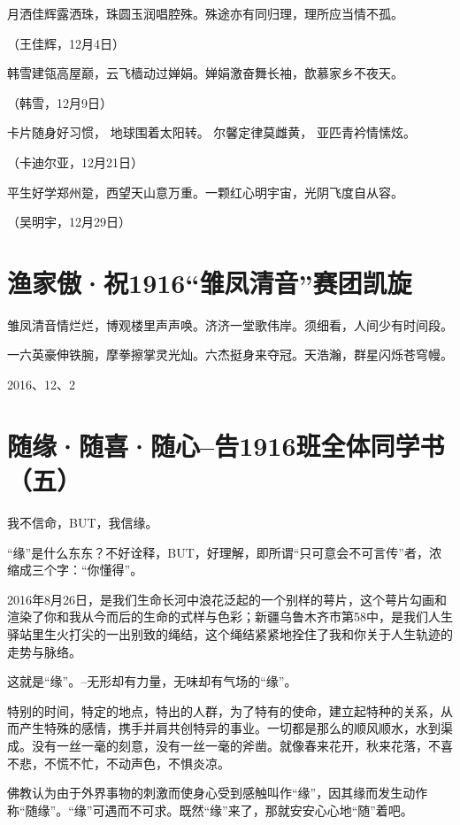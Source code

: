 \documentclass[openany]{ctexbook}
\begin{document}
月洒佳辉露洒珠，珠圆玉润唱腔殊。殊途亦有同归理，理所应当情不孤。

（王佳辉，12月4日）

韩雪建瓴高屋巅，云飞樯动过婵娟。婵娟激奋舞长袖，歆慕家乡不夜天。

（韩雪，12月9日）

卡片随身好习惯， 地球围着太阳转。 尔馨定律莫雌黄， 亚匹青衿情愫炫。

（卡迪尔亚，12月21日）

平生好学郑州跫，西望天山意万重。一颗红心明宇宙，光阴飞度自从容。

（吴明宇，12月29日）

\chapter*{\texorpdfstring{渔家傲·祝1916``雏凤清音''赛团凯旋}{渔家傲·祝1916雏凤清音赛团凯旋}}\label{sing}

雏凤清音情烂烂，博观楼里声声唤。济济一堂歌伟岸。须细看，人间少有时间段。

一六英豪伸铁腕，摩拳擦掌灵光灿。六杰挺身来夺冠。天浩瀚，群星闪烁苍穹幔。

2016、12、2

\chapter*{随缘·随喜·随心--告1916班全体同学书（五）}\label{letter5}

我不信命，BUT，我信缘。

``缘''是什么东东？不好诠释，BUT，好理解，即所谓``只可意会不可言传''者，浓缩成三个字：``你懂得''。

2016年8月26日，是我们生命长河中浪花泛起的一个别样的萼片，这个萼片勾画和渲染了你和我从今而后的生命的式样与色彩；新疆乌鲁木齐市第58中，是我们人生驿站里生火打尖的一出别致的绳结，这个绳结紧紧地拴住了我和你关于人生轨迹的走势与脉络。

这就是``缘''。--无形却有力量，无味却有气场的``缘''。

特别的时间，特定的地点，特出的人群，为了特有的使命，建立起特种的关系，从而产生特殊的感情，携手并肩共创特异的事业。一切都是那么的顺风顺水，水到渠成。没有一丝一毫的刻意，没有一丝一毫的斧凿。就像春来花开，秋来花落，不喜不悲，不慌不忙，不动声色，不惧炎凉。

佛教认为由于外界事物的刺激而使身心受到感触叫作``缘''，因其缘而发生动作称``随缘''。``缘''可遇而不可求。既然``缘''来了，那就安安心心地``随''着吧。
\end{document}

